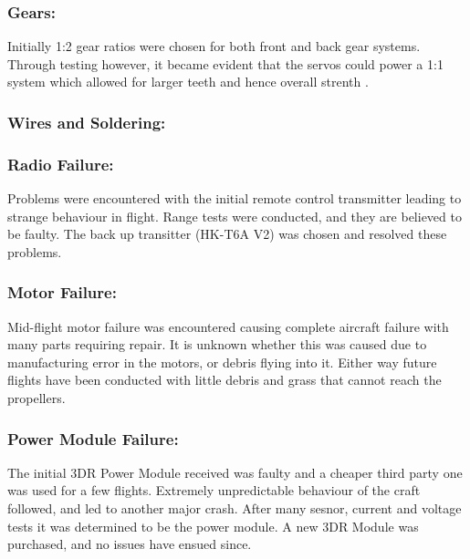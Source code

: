 \subsubsection*{Gears:} Initially 1:2 gear ratios were chosen for both front and back gear systems. Through testing however, it became evident that the servos could power a 1:1 system which allowed for larger teeth and hence overall strenth .

\subsubsection*{Wires and Soldering:}  

\subsubsection*{Radio Failure:} Problems were encountered with the initial remote control  transmitter leading to strange behaviour in flight. Range tests were conducted, and they are believed to be faulty. The back up transitter (HK-T6A V2) was chosen and resolved these problems.

\subsubsection*{Motor Failure:} Mid-flight motor failure was encountered causing complete aircraft failure with many parts requiring repair. It is unknown whether this was caused due to manufacturing error in the motors, or debris flying into it. Either way future flights have been conducted with little debris and grass that cannot reach the propellers. 

\subsubsection*{Power Module Failure:}  The initial 3DR Power Module received was faulty and a cheaper third party one was used for a few flights. Extremely unpredictable behaviour of the craft followed, and led to another major crash. After many sesnor, current and voltage tests it was determined to be the power module. A new 3DR Module was purchased, and no issues have ensued since.  

